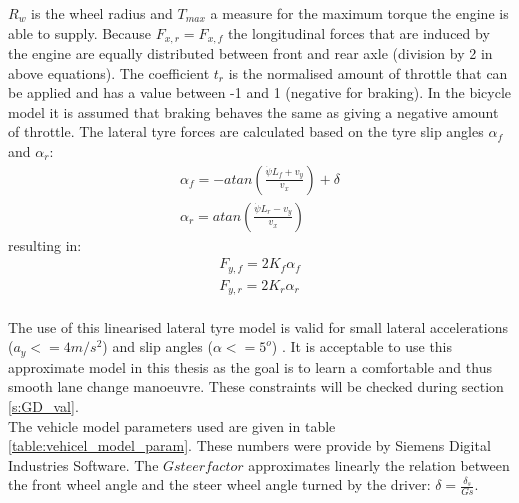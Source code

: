 $R_w$ is the wheel radius and $T_{max}$ a measure for the maximum torque the engine is able to supply. Because $F_{x,r} = F_{x, f}$ the longitudinal forces that are induced by the engine are equally distributed between front and rear axle (division by 2 in above equations). The coefficient $t_r$ is the normalised amount of throttle that can be applied and has a value between -1 and 1 (negative for braking). In the bicycle model it is assumed that braking behaves the same as giving a negative amount of throttle.
The lateral tyre forces are calculated based on the tyre slip angles $\alpha_f$ and $\alpha_r$:
\begin{equation}\label{eq:bicycle_slipangle}
\begin{aligned}
\alpha_f = -atan(\frac{\dot{\psi} L_f + v_y}{v_x}) + \delta\\
\alpha_r = atan(\frac{\dot{\psi} L_r - v_y}{v_x})
\end{aligned}
\end{equation}
resulting in:
\begin{equation}\label{eq:bicycle_Fy}
\begin{aligned}
F_{y,f} = 2 K_f \alpha_f\\
F_{y,r} = 2 K_r \alpha_r
\end{aligned}
\end{equation}\\
The use of this linearised lateral tyre model is valid for small lateral accelerations ($a_y <= 4 m/s^2$) and slip angles ($\alpha <= 5^o$) \cite{TongDuySon2019}. It is acceptable to use this approximate model in this thesis as the goal is to learn a comfortable and thus smooth lane change manoeuvre. These constraints will be checked during section \ref{s:GD_val}.\\

The vehicle model parameters used are given in table \ref{table:vehicel_model_param}. These numbers were provide by Siemens Digital Industries Software. The $Gsteerfactor$ approximates linearly the relation between the front wheel angle and the steer wheel angle turned by the driver: $\delta = \frac{\delta_s}{Gs}$.  

